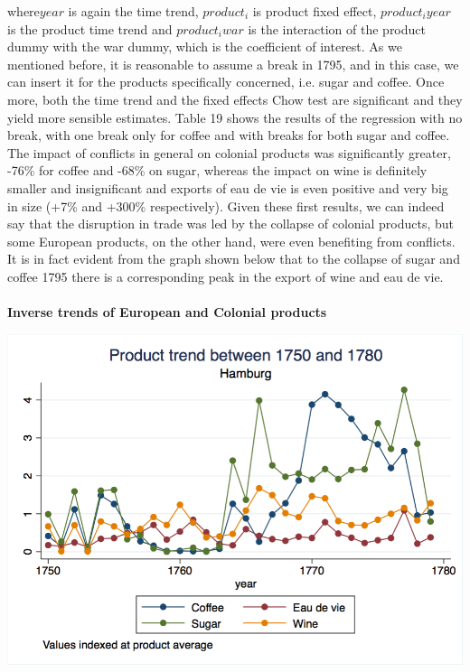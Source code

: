 \documentclass[12pt,a4paper,titlepage,english]{article}
\begin{document}
where$year$ is again the time trend, $product_i$ is product fixed effect, $product_iyear$ is the product time trend and $product_iwar$ is the interaction of the product dummy with the war dummy, which is the coefficient of interest. As we mentioned before, it is reasonable to assume a break in 1795, and in this case, we can insert it for the products specifically concerned, i.e. sugar and coffee. Once more, both the time trend and the fixed effects Chow test are significant and they yield more sensible estimates. Table 19 shows the results of the regression with no break, with one break only for coffee and with breaks for both sugar and coffee. \\
The impact of conflicts in general on colonial products was significantly greater, -76\% for coffee and -68\% on sugar, whereas the impact on wine is definitely smaller and insignificant and exports of eau de vie is even positive and very big in size (+7\% and +300\% respectively).
Given these first results, we can indeed say that the disruption in trade was led by the collapse of colonial products, but some European products, on the other hand, were even benefiting from conflicts. It is in fact evident from the graph shown below that to the collapse of sugar and coffee 1795 there is a corresponding peak in the export of wine and eau de vie.\\~\\
\caption{\textbf{Inverse trends of European and Colonial products}}
\includegraphics[scale=.35]{hamburg_product_1780.png}
\end{document}
